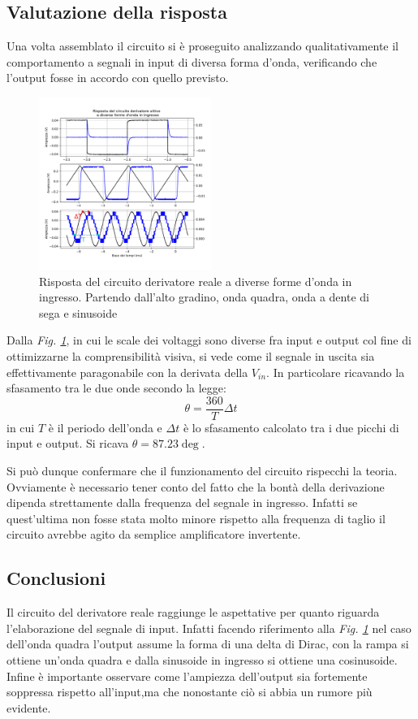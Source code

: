 \documentclass[journal]{IEEEtran}
\begin{document}
\subsection{\textbf{Valutazione della risposta}}
Una volta assemblato il circuito si è proseguito analizzando qualitativamente il comportamento a segnali in input di diversa forma d'onda, verificando che l'output fosse in accordo con quello previsto.

\begin{figure}[H]%
\begin {center}
\includegraphics[width=0.50\textwidth]{analysis/output/OPA-differentiator.pdf}
\caption{Risposta del circuito derivatore reale a diverse forme d’onda in ingresso. Partendo dall’alto gradino, onda quadra, onda a dente di sega e sinusoide}
\label{fig:derivatore}
\end {center}
\end{figure}
Dalla \textit{Fig. \ref{fig:derivatore}}, in cui le scale dei voltaggi sono diverse fra input e output col fine di ottimizzarne la comprensibilità visiva, si vede come il segnale in uscita sia effettivamente paragonabile con la derivata della $V_{in}$. In particolare ricavando la sfasamento tra le due onde secondo la legge:
\[\theta = \frac{360}{T}\Delta t\]
in cui $T$ è il periodo dell'onda e $\Delta t$ è lo sfasamento calcolato tra i due picchi di input e output. Si ricava $\theta = 87.23 \deg$.

Si può dunque confermare che il funzionamento del circuito rispecchi la teoria. Ovviamente è necessario tener conto del fatto che la bontà della derivazione dipenda strettamente dalla frequenza del segnale in ingresso. Infatti se quest'ultima non fosse stata molto minore rispetto alla frequenza di taglio il circuito avrebbe agito da semplice amplificatore invertente.
\subsection{\textbf{Conclusioni}}
Il circuito del derivatore reale raggiunge le aspettative per quanto riguarda l'elaborazione del segnale di input. Infatti facendo riferimento alla \textit{Fig. \ref{fig:derivatore}} nel caso dell'onda quadra l'output assume la forma di una delta di Dirac, con la rampa si ottiene un'onda quadra e dalla sinusoide in ingresso si ottiene una cosinusoide. Infine è importante osservare come l'ampiezza dell'output sia fortemente soppressa rispetto all'input,ma che nonostante ciò si abbia un rumore più evidente.
\end{document}
